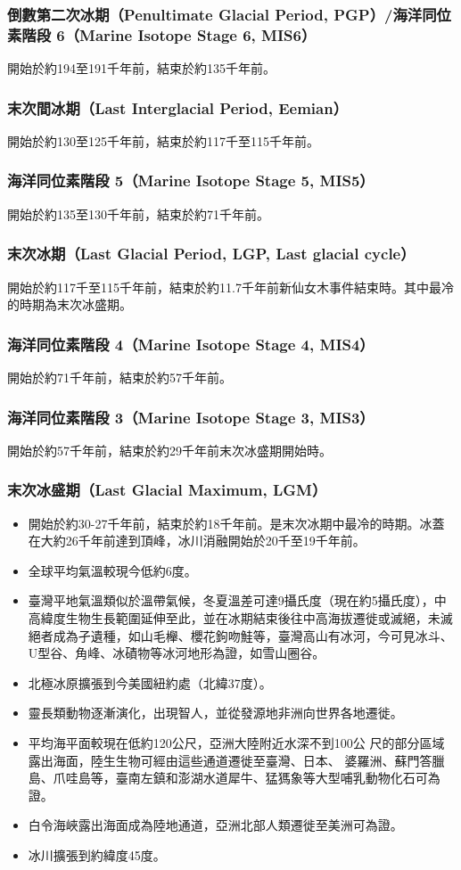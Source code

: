 \documentclass[a4paper,12pt]{report}
\begin{document}
\subsubsection{倒數第二次冰期（Penultimate Glacial Period, PGP）/海洋同位素階段 6（Marine Isotope Stage 6, MIS6）}
開始於約194至191千年前，結束於約135千年前。
\subsubsection{末次間冰期（Last Interglacial Period, Eemian）}
開始於約130至125千年前，結束於約117千至115千年前。
\subsubsection{海洋同位素階段 5（Marine Isotope Stage 5, MIS5）}
開始於約135至130千年前，結束於約71千年前。
\subsubsection{末次冰期（Last Glacial Period, LGP, Last glacial cycle）}
開始於約117千至115千年前，結束於約11.7千年前新仙女木事件結束時。其中最冷的時期為末次冰盛期。
\subsubsection{海洋同位素階段 4（Marine Isotope Stage 4, MIS4）}
開始於約71千年前，結束於約57千年前。
\subsubsection{海洋同位素階段 3（Marine Isotope Stage 3, MIS3）}
開始於約57千年前，結束於約29千年前末次冰盛期開始時。
\subsubsection{末次冰盛期（Last Glacial Maximum, LGM）}
\begin{itemize}
\item 開始於約30-27千年前，結束於約18千年前。是末次冰期中最冷的時期。冰蓋在大約26千年前達到頂峰，冰川消融開始於20千至19千年前。
\item 全球平均氣溫較現今低約6度。
\item 臺灣平地氣溫類似於溫帶氣候，冬夏溫差可達9攝氏度（現在約5攝氏度），中高緯度生物生長範圍延伸至此，並在冰期結束後往中高海拔遷徙或滅絕，未滅絕者成為孑遺種，如山毛櫸、櫻花鉤吻鮭等，臺灣高山有冰河，今可見冰斗、U型谷、角峰、冰磧物等冰河地形為證，如雪山圈谷。
\item 北極冰原擴張到今美國紐約處（北緯37度）。
\item 靈長類動物逐漸演化，出現智人，並從發源地非洲向世界各地遷徙。
\item 平均海平面較現在低約120公尺，亞洲大陸附近水深不到100公 尺的部分區域露出海面，陸生生物可經由這些通道遷徙至臺灣、日本、 婆羅洲、蘇門答臘島、爪哇島等，臺南左鎮和澎湖水道犀牛、猛獁象等大型哺乳動物化石可為證。
\item 白令海峽露出海面成為陸地通道，亞洲北部人類遷徙至美洲可為證。
\item 冰川擴張到約緯度45度。
\end{itemize}
\end{document}

